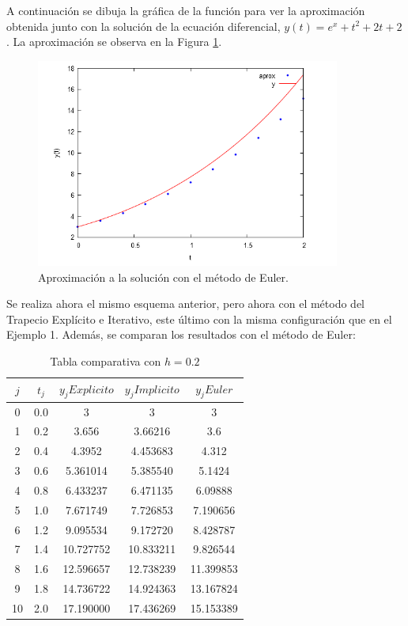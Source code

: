 \documentclass{article}
\theoremstyle{theorem-style}  %
\theoremstyle{definition-style}
\theoremstyle{example-style}
\begin{document}
A continuación se dibuja la gráfica de la función para ver la aproximación obtenida junto con la solución de la ecuación diferencial, $y(t)= e^x + t^2 + 2t + 2$. La aproximación se observa en la Figura \ref{fig:aprox1}.

	\begin{figure}[h]
		\centering
		\includegraphics[width=10cm]{./Images/ejtp1-1.png}
		\caption{Aproximación a la solución con el método de Euler.}
		\label{fig:aprox1}
	\end{figure}

Se realiza ahora el mismo esquema anterior, pero ahora con el método del Trapecio Explícito e Iterativo, este último con la misma configuración que en el Ejemplo 1. Además, se comparan los resultados con el método de Euler:

		\begin{table}[H]
			\centering
			\begin{tabular}{|| c | c | c | c | c||}
				\hline
				\hline $j$ &  $t_j $ & $y_j Explicito$ & $y_j Implicito$ & $y_j Euler$ \\
				\hline 0 & 0.0 & 3 & 3 & 3 \\
				\hline 1 & 0.2 & 3.656 & 3.66216 & 3.6 \\
				\hline 2 & 0.4 & 4.3952 & 4.453683 & 4.312 \\
				\hline 3 & 0.6 & 5.361014 & 5.385540 & 5.1424 \\
				\hline 4 & 0.8 & 6.433237 & 6.471135 & 6.09888 \\
				\hline 5 & 1.0 & 7.671749 & 7.726853 & 7.190656 \\
				\hline 6 & 1.2 & 9.095534 & 9.172720 & 8.428787 \\
				\hline 7 & 1.4 & 10.727752 & 10.833211 & 9.826544 \\
				\hline 8 & 1.6 & 12.596657 & 12.738239 & 11.399853 \\
				\hline 9 & 1.8 & 14.736722 & 14.924363 & 13.167824 \\
				\hline 10 & 2.0 & 17.190000 & 17.436269 & 15.153389 \\
				\hline
				\hline
			\end{tabular}
			\caption{Tabla comparativa con $h=0.2$}
			\label{table:trapecio-ejtp1.2}
	\end{table}
\end{document}
